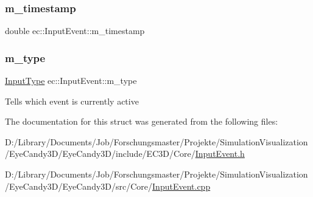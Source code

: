 \mbox{\label{structec_1_1_input_event_ada54908facf585cb714bd6712d8f6c4d}} 
\subsubsection{\texorpdfstring{m\+\_\+timestamp}{m\_timestamp}}
{\footnotesize\ttfamily double ec\+::\+Input\+Event\+::m\+\_\+timestamp}

\mbox{\label{structec_1_1_input_event_a07aadaf18da2952478b803bbd4122bb7}} 
\subsubsection{\texorpdfstring{m\+\_\+type}{m\_type}}
{\footnotesize\ttfamily \mbox{\hyperlink{namespaceec_ae2d697393ea83b34b18ab14eb5dacbca}{Input\+Type}} ec\+::\+Input\+Event\+::m\+\_\+type}

Tells which event is currently active 

The documentation for this struct was generated from the following files\+:\begin{DoxyCompactItemize}
\item 
D\+:/\+Library/\+Documents/\+Job/\+Forschungsmaster/\+Projekte/\+Simulation\+Visualization/\+Eye\+Candy3\+D/\+Eye\+Candy3\+D/include/\+E\+C3\+D/\+Core/\mbox{\hyperlink{_input_event_8h}{Input\+Event.\+h}}\item 
D\+:/\+Library/\+Documents/\+Job/\+Forschungsmaster/\+Projekte/\+Simulation\+Visualization/\+Eye\+Candy3\+D/\+Eye\+Candy3\+D/src/\+Core/\mbox{\hyperlink{_input_event_8cpp}{Input\+Event.\+cpp}}\end{DoxyCompactItemize}
